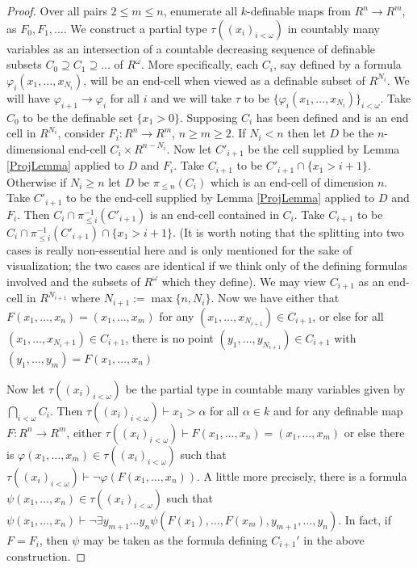 \documentclass[10pt,a4paper]{amsart}
\begin{document}
\begin{proof}
    Over all pairs $2\leq m\leq n$, enumerate all $k$-definable maps from $R^n\to R^m$, as $F_0,F_1,\dots$. We construct a partial type $\tau((x_i)_{i<\omega})$ in countably many variables as an intersection of a countable decreasing sequence of definable subsets $C_0\supseteq C_1\supseteq\dots$ of $R^\omega$. More specifically, each $C_i$, say defined by a formula $\varphi_i(x_1,\dots,x_{N_i})$, will be an end-cell when viewed as a definable subset of $R^{N_i}$. We will have $\varphi_{i+1}\to\varphi_{i}$ for all $i$ and we will take $\tau$ to be $\{\varphi_i(x_1,\dots,x_{N_i})\}_{i<\omega}$. Take $C_0$ to be the definable set $\{x_1>0\}$. Supposing $C_i$ has been defined and is an end cell in $R^{N_i
    }$, consider $F_i:R^n\to R^m$, $n\geq m\geq 2$. If $N_i<n$ then let $D$ be the $n$-dimensional end-cell $C_i\times R^{n-N_i}$. Now let $C'_{i+1}$ be the cell supplied by Lemma \ref{ProjLemma} applied to $D$ and $F_i$. Take $C_{i+1}$ to be $C'_{i+1}\cap \{x_1>i+1\}$. Otherwise if $N_i\geq n$ let $D$ be $\pi_{\leq n}(C_i)$ which is an end-cell of dimension $n$. Take $C'_{i+1}$ to be the end-cell supplied by Lemma \ref{ProjLemma} applied to $D$ and $F_i$. Then $C_i\cap \pi^{-1}_{\leq i}(C'_{i+1})$ is an end-cell contained in $C_i$. Take $C_{i+1}$ to be $C_i\cap \pi^{-1}_{\leq i}(C'_{i+1})\cap\{x_1>i+1\}$. (It is worth noting that the splitting into two cases is really non-essential here and is only mentioned for the sake of visualization; the two cases are identical if we think only of the defining formulas involved and the subsets of $R^\omega$ which they define). We may view $C_{i+1}$ as an end-cell in $R^{N_{i+1}}$ where $N_{i+1}:=\max\{n,N_i\}$. Now we have either that $F(x_1,\dots,x_n)=(x_1,\dots,x_m)$ for any $(x_1,\dots, x_{N_{i+1}})\in C_{i+1}$, or else for all $(x_1,\dots, x_{N_i+1})\in C_{i+1}$, there is no point $(y_1,\dots,y_{N_{i+1}})\in C_{i+1}$ with $(y_1,\dots,y_m)=F(x_1,\dots,x_n)$
    
    Now let $\tau((x_i)_{i<\omega})$ be the partial type in countable many variables given by $\bigcap_{i<\omega} C_i$. Then $\tau((x_i)_{i<\omega})\vdash x_1>\alpha$ for all $\alpha\in k$ and for any definable map $F:R^n\to R^m$, either $\tau((x_i)_{i<\omega})\vdash F(x_1,\dots,x_n)=(x_1,\dots,x_m)$ or else there is $\varphi(x_1,\dots,x_m)\in \tau((x_i)_{i<\omega})$ such that $\tau((x_i)_{i<\omega})\vdash \lnot\varphi(F(x_1,\dots,x_n))$. A little more precisely, there is a formula $\psi(x_1,\dots,x_n)\in\tau((x_i)_{i<\omega})$ such that $\psi(x_1,\dots,x_n)\vdash \lnot \exists y_{m+1}\dots y_n\psi(F(x_1),\dots,F(x_m),y_{m+1},\dots,y_n)$. In fact, if $F=F_i$, then $\psi$ may be taken as the formula defining $C_{i+1}'$ in the above construction.


\end{proof}
\end{document}
